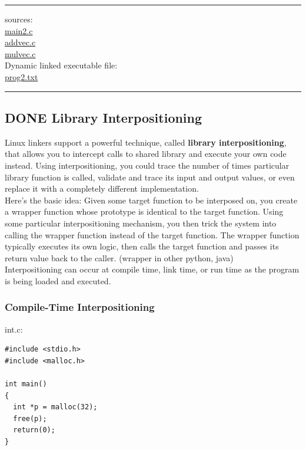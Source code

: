 \documentclass[11pt]{article}
\begin{document}
\noindent\rule{\textwidth}{0.5pt}
sources:\\
\href{code/c7-linking/main2.c}{main2.c}\\
\href{code/c7-linking/addvec.c}{addvec.c}\\
\href{code/c7-linking/mulvec.c}{mulvec.c}\\

Dynamic linked executable file:\\
\href{code/c7-linking/prog2.txt}{prog2.txt}\\

\noindent\rule{\textwidth}{0.5pt}

\subsection{{\bfseries\sffamily DONE} Library Interpositioning}
\label{sec:org0a4309f}
Linux linkers support a powerful technique, called \textbf{library interpositioning}, that allows you to intercept calls to shared library and execute your own code instead. Using interpositioning, you could trace the number of times particular library function is called, validate and trace its input and output values, or even replace it with a completely different implementation.\\

Here’s the basic idea: Given some target function to be interposed on, you create a wrapper function whose prototype is identical to the target function. Using some particular interpositioning mechanism, you then trick the system into calling the wrapper function instead of the target function. The wrapper function typically executes its own logic, then calls the target function and passes its return value back to the caller. (wrapper in other python, java)\\

Interpositioning can occur at compile time, link time, or run time as the program is being loaded and executed.\\


\subsubsection{Compile-Time Interpositioning}
\label{sec:org42f4c7d}
int.c:\\
\begin{verbatim}
#include <stdio.h>
#include <malloc.h>

int main()
{
  int *p = malloc(32);
  free(p);
  return(0);
}
\end{verbatim}
\end{document}
